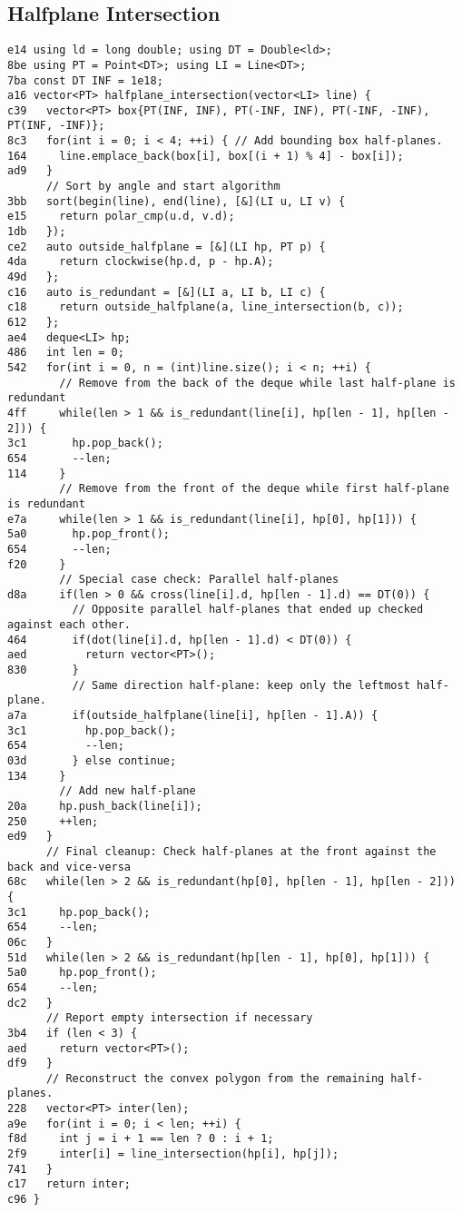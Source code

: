 \documentclass[10pt, a4paper, twoside]{article}
\begin{document}
\subsection{Halfplane Intersection}
\begin{lstlisting}
e14 using ld = long double; using DT = Double<ld>;
8be using PT = Point<DT>; using LI = Line<DT>;
7ba const DT INF = 1e18;
a16 vector<PT> halfplane_intersection(vector<LI> line) {
c39   vector<PT> box{PT(INF, INF), PT(-INF, INF), PT(-INF, -INF), PT(INF, -INF)};
8c3   for(int i = 0; i < 4; ++i) { // Add bounding box half-planes.
164     line.emplace_back(box[i], box[(i + 1) % 4] - box[i]);
ad9   }
      // Sort by angle and start algorithm
3bb   sort(begin(line), end(line), [&](LI u, LI v) {
e15     return polar_cmp(u.d, v.d);
1db   });
ce2   auto outside_halfplane = [&](LI hp, PT p) {
4da     return clockwise(hp.d, p - hp.A);
49d   };
c16   auto is_redundant = [&](LI a, LI b, LI c) {
c18     return outside_halfplane(a, line_intersection(b, c));
612   };
ae4   deque<LI> hp;
486   int len = 0;
542   for(int i = 0, n = (int)line.size(); i < n; ++i) {
        // Remove from the back of the deque while last half-plane is redundant
4ff     while(len > 1 && is_redundant(line[i], hp[len - 1], hp[len - 2])) {
3c1       hp.pop_back();
654       --len;
114     }
        // Remove from the front of the deque while first half-plane is redundant
e7a     while(len > 1 && is_redundant(line[i], hp[0], hp[1])) {
5a0       hp.pop_front();
654       --len;
f20     }
        // Special case check: Parallel half-planes
d8a     if(len > 0 && cross(line[i].d, hp[len - 1].d) == DT(0)) {
          // Opposite parallel half-planes that ended up checked against each other.
464       if(dot(line[i].d, hp[len - 1].d) < DT(0)) {
aed         return vector<PT>();
830       }
          // Same direction half-plane: keep only the leftmost half-plane.
a7a       if(outside_halfplane(line[i], hp[len - 1].A)) {
3c1         hp.pop_back();
654         --len;
03d       } else continue;
134     }
        // Add new half-plane
20a     hp.push_back(line[i]);
250     ++len;
ed9   }
      // Final cleanup: Check half-planes at the front against the back and vice-versa
68c   while(len > 2 && is_redundant(hp[0], hp[len - 1], hp[len - 2])) {
3c1     hp.pop_back();
654     --len;
06c   }
51d   while(len > 2 && is_redundant(hp[len - 1], hp[0], hp[1])) {
5a0     hp.pop_front();
654     --len;
dc2   }
      // Report empty intersection if necessary
3b4   if (len < 3) {
aed     return vector<PT>();
df9   }
      // Reconstruct the convex polygon from the remaining half-planes.
228   vector<PT> inter(len);
a9e   for(int i = 0; i < len; ++i) {
f8d     int j = i + 1 == len ? 0 : i + 1;
2f9     inter[i] = line_intersection(hp[i], hp[j]);
741   }
c17   return inter;
c96 }
\end{lstlisting}
\end{document}
